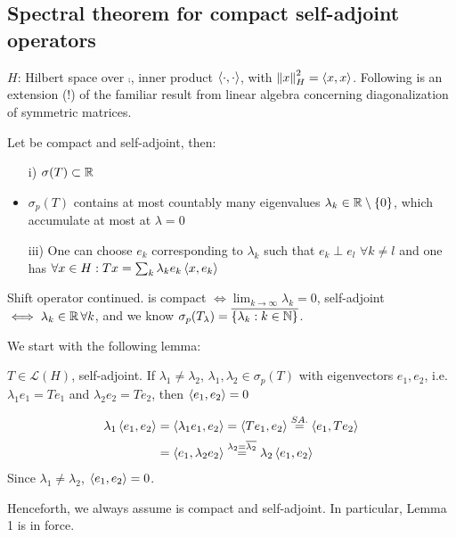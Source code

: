 \subsection{Spectral theorem for compact self-adjoint operators}
$H$: Hilbert space over $\comp$, inner product $\left<{\cdot},{\cdot}\right>$, with $\left\|{x}\right\|^2_H=\left<{x},{x}\right>$. Following is an extension (!) of the familiar result from linear algebra concerning diagonalization of symmetric matrices.
\begin{theorem}\nl
	Let   be compact and self-adjoint, then:
	\begin{itemize}
		\item [i)] $\sigma(T)\subset\mathbb{R}$
		\item $\sigma_p(T)$ contains at most countably many eigenvalues $\lambda_k\in\mathbb{R}\setminus\{0\}$, which accumulate at most at $\lambda=0$
		\item [iii)] One can choose $e_k$  corresponding to $\lambda_k$ such that $e_k\perp e_l$ $\forall k\neq l$ and one has $\forall x\in H:Tx=\sum_k \lambda_k e_k\left<{x},{e_k}\right>$
	\end{itemize}
\end{theorem}
\begin{example}\nl
	Shift operator  continued. is compact $\iff \lim_{k\to\infty}\lambda_k=0$, self-adjoint $\iff \lambda_k\in\mathbb{R}\,\forall k$, and we know $\sigma_p(T_\lambda)=\overline{\{\lambda_k:k\in\mathbb{N}\}}$.
\end{example}
We start with the following lemma:
\begin{lemma}[Lemma 1]
	$T\in\mathcal{L}(H)$, self-adjoint. If $\lambda_1\neq\lambda_2$, $\lambda_1,\lambda_2\in\sigma_p(T)$ with eigenvectors $e_1,e_2$, i.e. $\lambda_1 e_1=Te_1$ and $\lambda_2e_2=Te_2$, then $\left<{e_1},{e_2}\right>=0$
	\begin{pf}{}{}
		\begin{equation}
			\begin{split}
				\lambda_1\left<{e_1},{e_2}\right>&=\left<{\lambda_1e_1},{e_2}\right>=\left<{Te_1},{e_2}\right>\stackrel{SA.}{=}\left<{e_1},{Te_2}\right>\\
				&=\left<{e_1},{\lambda_2e_2}\right>\stackrel{\lambda_2=\overline{\lambda_2}}{=}\lambda_2\left<{e_1},{e_2}\right>
			\end{split}
		\end{equation}
		Since $\lambda_1\neq\lambda_2$, $\left<{e_1},{e_2}\right>=0$.
	\end{pf}
\end{lemma}
Henceforth, we always assume  is compact and self-adjoint. In particular, Lemma 1 is in force.\\
